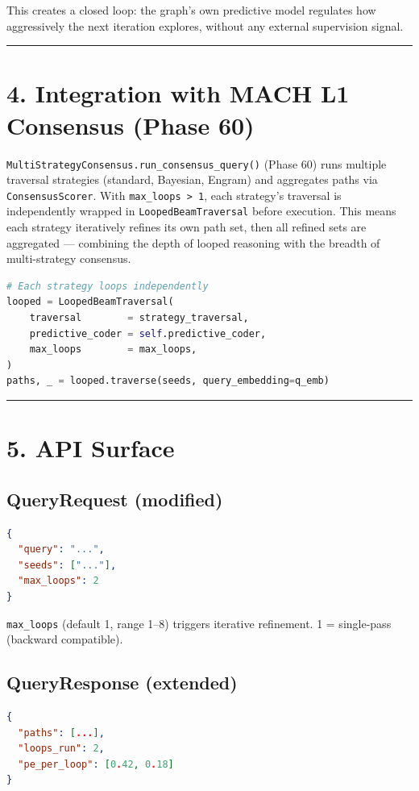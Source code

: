 This creates a closed loop: the graph's own predictive model regulates how aggressively the next iteration explores, without any external supervision signal.

\medskip\noindent\rule{\linewidth}{0.4pt}\medskip

\section*{4. Integration with MACH L1 Consensus (Phase 60)}

\texttt{MultiStrategyConsensus.run\_consensus\_query()} (Phase 60) runs multiple traversal strategies (standard, Bayesian, Engram) and aggregates paths via \texttt{ConsensusScorer}. With \texttt{max\_loops > 1}, each strategy's traversal is independently wrapped in \texttt{LoopedBeamTraversal} before execution. This means each strategy iteratively refines its own path set, then all refined sets are aggregated --- combining the depth of looped reasoning with the breadth of multi-strategy consensus.

\begin{lstlisting}[language=Python]
# Each strategy loops independently
looped = LoopedBeamTraversal(
    traversal        = strategy_traversal,
    predictive_coder = self.predictive_coder,
    max_loops        = max_loops,
)
paths, _ = looped.traverse(seeds, query_embedding=q_emb)
\end{lstlisting}

\medskip\noindent\rule{\linewidth}{0.4pt}\medskip

\section*{5. API Surface}

\subsection*{QueryRequest (modified)}
\begin{lstlisting}[language=Json]
{
  "query": "...",
  "seeds": ["..."],
  "max_loops": 2
}
\end{lstlisting}
\texttt{max\_loops} (default 1, range 1--8) triggers iterative refinement. 1 = single-pass (backward compatible).

\subsection*{QueryResponse (extended)}
\begin{lstlisting}[language=Json]
{
  "paths": [...],
  "loops_run": 2,
  "pe_per_loop": [0.42, 0.18]
}
\end{lstlisting}

